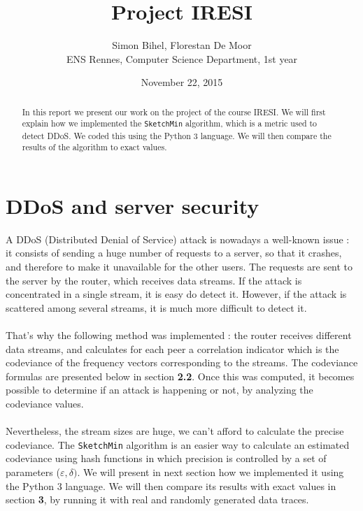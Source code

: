\documentclass[a4paper]{article}%
\begin{document}
\title{Project IRESI}

\author{Simon Bihel, Florestan De Moor \\ ENS Rennes, Computer Science Department, 1st year}

\date{November 22, 2015}

\maketitle

\begin{abstract}
	In this report we present our work on the project of the course IRESI. We will first explain how we implemented the \texttt{SketchMin} algorithm, which is a metric used to detect DDoS. We coded this using the Python 3 language. We will then compare the results of the algorithm to exact values.
\end{abstract}


\section{DDoS and server security}

A DDoS (Distributed Denial of Service) attack is nowadays a well-known issue : it consists of sending a huge number of requests to a server, so that it crashes, and therefore to make it unavailable for the other users. The requests are sent to the server by the router, which receives data streams. If the attack is concentrated in a single stream, it is easy do detect it. However, if the attack is scattered among several streams, it is much more difficult to detect it.

\paragraph{}That's why the following method was implemented : the router receives different data streams, and calculates for each peer a correlation indicator which is the codeviance of the frequency vectors corresponding to the streams. The codeviance formulas are presented below in section \textbf{2.2}. Once this was computed, it becomes possible to determine if an attack is happening or not, by analyzing the codeviance values.

\paragraph{}Nevertheless, the stream sizes are huge, we can't afford to calculate the precise codeviance. The \texttt{SketchMin} algorithm is an easier way to calculate an estimated codeviance using hash functions in which precision is controlled by a set of parameters ($\varepsilon, \delta)$. We will present in next section how we implemented it using the Python 3 language. We will then compare its results with exact values in section \textbf{3}, by running it with real and randomly generated data traces.
\end{document}
